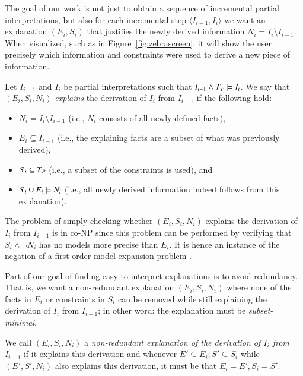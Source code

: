The goal of our work is not just to obtain a sequence of incremental partial interpretations, but also for each incremental step $\langle I_{i-1}, I_i \rangle$ we want an explanation $(E_i,S_i)$ that justifies the newly derived information $N_i = I_i \setminus I_{i-1}$. When visualized, such as in Figure~\ref{fig:zebrascreen}, it will show the user precisely which information and constraints were used to derive a new piece of information.

\begin{definition}
 Let $I_{i-1}$ and $I_i$ be partial interpretations such that $I_{i-1}\land T_P \models I_i$.
 We say that $(E_i,S_i,N_i)$ \emph{explains} the derivation of $I_{i}$ from $I_{i-1}$ if the following hold:
\begin{itemize}
    \item $N_i= I_i \setminus I_{i-1}$ (i.e., $N_i$ consists of all newly defined facts), 
	\item $E_i\subseteq I_{i - 1}$ (i.e., the explaining facts are a subset of what was previously derived),
	\item $S_i \subseteq T_P$ (i.e., a subset of the constraints is used), and 
	\item $S_i \cup E_i \models N_i$ (i.e., all newly derived information indeed follows from this explanation).
\end{itemize}
\end{definition}

The problem of simply checking whether $(E_i,S_i,N_i)$ explains the derivation of $I_{i}$ from $I_{i-1}$ is in co-NP since this problem can be performed by verifying that $S_i \land \lnot N_i$ has no models more precise than $E_i$. It is hence an instance of the negation of a first-order model expansion problem \cite{DBLP:conf/lpar/KolokolovaLMT10}.

Part of our goal of finding easy to interpret explanations is to avoid redundancy. 
That is, we want a non-redundant explanation $(E_i,S_i,N_i)$ where none of the facts in $E_i$ or constraints in $S_i$ can be removed while still explaining the derivation of $I_i$ from $I_{i-1}$; in other word: the explanation must be \textit{subset-minimal}. 
\begin{definition}
 We call $(E_i,S_i,N_i)$ a \emph{non-redundant explanation of  the derivation of $I_i$ from $I_{i-1}$} if it explains this derivation and whenever $E'\subseteq E_i; S'\subseteq S_i$ while $(E',S',N_i)$ also explains this derivation, it must be that $E_i=E', S_i=S'$. 
\end{definition}

